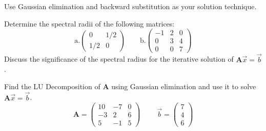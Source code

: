 \documentclass[12pt, answers]{exam}
\newcommand{\ve}[1]{\ensuremath{\mathbf{#1}}}
\begin{document}
\begin{questions}
Use Gaussian elimination and backward substitution as your solution technique.


\vspace*{3em}
\addpoints
\question[10] Determine the spectral radii of the following matrices:
%
\begin{equation}
\text{a.} \begin{pmatrix}
   0   & 1/2 \\
   1/2 &  0  
\end{pmatrix} \qquad
%
\text{b.} \begin{pmatrix}
  -1 &  2 & 0 \\
   0 &  3 & 4 \\
   0 &  0 & 7
\end{pmatrix} \nonumber
\end{equation}
%
Discuss the significance of the spectral radius for the iterative solution of $\ve{A}\vec{x} = \vec{b}$.


\vspace*{3em}
\addpoints
\question[10] Find the LU Decomposition of $\ve{A}$ using Gaussian elimination and use it to solve $\ve{A}\vec{x} = \vec{b}$.
%
\begin{equation}
\ve{A} = \begin{pmatrix}
  10 & -7 & 0 \\
  -3 &  2 & 6 \\
   5 & -1 & 5
\end{pmatrix} \; \qquad
%
\vec{b} = \begin{pmatrix} 7 \\ 4 \\ 6 \end{pmatrix} \nonumber
\end{equation}


\end{questions}
\end{document}
